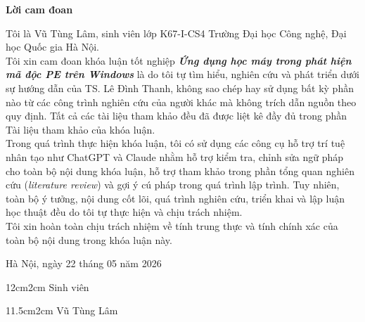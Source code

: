 \setcounter{page}{1}
\begin{center}
\textbf{\large{Lời cam đoan}	}
\end{center}
Tôi là Vũ Tùng Lâm, sinh viên lớp K67-I-CS4
Trường Đại học Công nghệ, Đại học Quốc gia Hà Nội.
\\
Tôi xin cam đoan khóa luận tốt nghiệp
\textbf{\textit{Ứng dụng học máy trong phát hiện mã độc PE trên Windows}}
là do tôi tự tìm hiểu, nghiên cứu và phát triển dưới sự hướng dẫn
của TS. Lê Đình Thanh, không sao chép hay sử dụng bất kỳ phần nào
từ các công trình nghiên cứu của người khác mà không trích dẫn
nguồn theo quy định. Tất cả các tài liệu tham khảo đều đã
được liệt kê đầy đủ trong phần Tài liệu tham khảo của khóa luận.
\\
Trong quá trình thực hiện khóa luận, tôi có sử dụng các công cụ hỗ trợ
trí tuệ nhân tạo như ChatGPT và Claude nhằm hỗ trợ kiểm tra, chỉnh sửa
ngữ pháp cho toàn bộ nội dung khóa luận, hỗ trợ tham khảo trong phần
tổng quan nghiên cứu (\textit{literature review}) và gợi ý cú pháp trong
quá trình lập trình. Tuy nhiên, toàn bộ ý tưởng, nội dung cốt lõi,
quá trình nghiên cứu, triển khai và lập luận học thuật đều do tôi tự
thực hiện và chịu trách nhiệm.
\\
Tôi xin hoàn toàn chịu trách nhiệm về tính trung thực và tính chính xác
của toàn bộ nội dung trong khóa luận này.

\begin{flushright}
Hà Nội, ngày 22 tháng 05 năm 2026
\end{flushright}

\begin{changemargin}{12cm}{2cm}
Sinh viên
\\[2cm]
\end{changemargin}

\begin{changemargin}{11.5cm}{2cm}
Vũ Tùng Lâm
\end{changemargin}